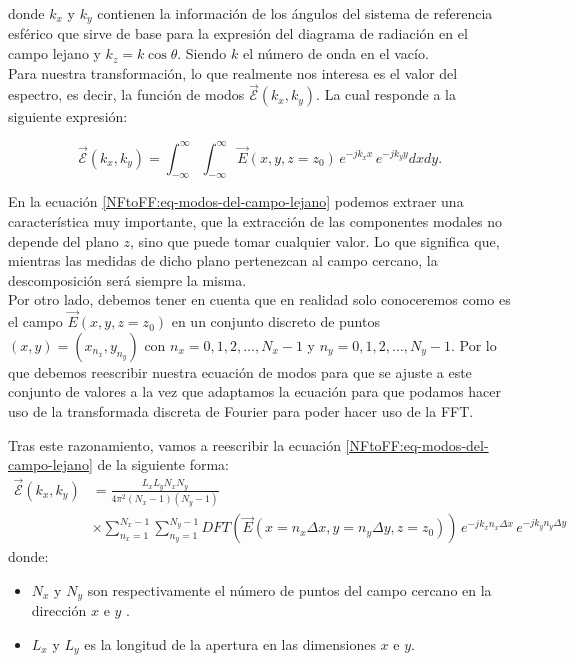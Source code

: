 \documentclass{article}
\begin{document}
donde $k_{x}$ y $ k_{y}$  contienen la información de los ángulos del sistema de referencia esférico que sirve de base para la expresión del diagrama de radiación en el campo lejano y  $k_{z}=k\cos\theta$. Siendo $k$ el número de onda en el vacío.
\\

Para nuestra transformación, lo que realmente nos interesa es el valor del espectro, es decir, la función de modos ${\vec{\mathcal{E}}}(k_{x},k_{y})$. La cual responde a la siguiente expresión:

\begin{equation}
{\vec{\mathcal{E}}}(k_{x},k_{y})=\int_{-\infty}^{\infty}\int_{-\infty}^{\infty}\vec{E}(x,y,z=z_{0})\,e^{-j k_{x}x}\,e^{-jk_{y}y} dx dy.
\label{NFtoFF:eq-modos-del-campo-lejano}
\end{equation}
 
En la ecuación \eqref{NFtoFF:eq-modos-del-campo-lejano} podemos extraer una característica muy importante,  que la extracción de las componentes modales no depende del plano $z$, sino que puede tomar cualquier valor. Lo que significa que, mientras las medidas de dicho plano pertenezcan al campo cercano, la descomposición será siempre la misma.\\
Por otro lado, debemos tener en cuenta que en realidad solo conoceremos como es el campo  $\vec{E}(x,y,z=z_{0})$ en un conjunto discreto de puntos $(x,y) = (x_{n_{x}},y_{n_{y}})$ con  $n_{x}=0,1,2,\ldots,N_{x}-1$ y  $n_{y}=0,1,2,\ldots,N_{y}-1$. Por lo que debemos reescribir nuestra ecuación de modos para que se ajuste a este conjunto de valores a la vez que adaptamos la ecuación para que podamos hacer uso de la transformada discreta de Fourier para poder hacer uso de la FFT.

\newpage

Tras este razonamiento, vamos a reescribir la ecuación \eqref{NFtoFF:eq-modos-del-campo-lejano} de la siguiente forma: 
\begin{align}
{\vec{\mathcal{E}}}(k_{x},k_{y})&=\frac{L_{x}L_{y}N_{x}N_{y}}{4 \pi^2 (N_{x}-1)(N_{y}-1)} \nonumber \\
&\times \sum_{n_{x}=1}^{N_{x}-1}\sum_{n_{y}=1}^{N_{y}-1} DFT(\vec{E}(x=n_{x}\Delta
x,y=n_{y}\Delta
y,z=z_{0}))\,e^{-j k_{x}n_{x} \Delta x}\,e^{-jk_{y}n_{y} \Delta y}
\label{NFtoFF:eq-fourier}
\end{align}
donde:
\begin{itemize}
    \item $N_{x}$ y $N_{y}$ son respectivamente el número de puntos del campo cercano en la dirección $x$ e $y$ .
    \item $L_{x}$ y $L_{y}$  es la longitud de la apertura en las dimensiones  $x$ e $y$.
\end{itemize}
\end{document}
